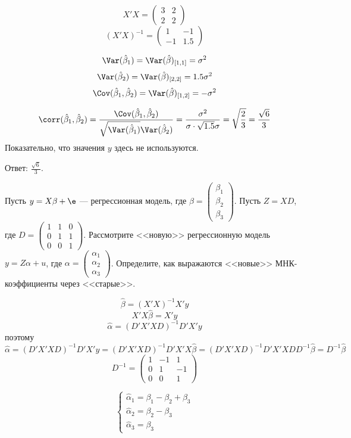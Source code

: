\documentclass[pdftex,11pt,openany]{book}\usepackage[]{graphicx}\usepackage[]{color}
\begin{document}
\begin{solution}
\[X'X=\left(\begin{array}{cc}
3 & 2 \\ 
2 & 2
\end{array}\right) \]
\[(X'X)^{-1}=\left(\begin{array}{cc}
1 & -1 \\ 
-1 & 1.5
\end{array}\right) \]

\[\Var(\hat\beta_1)=\Var(\hat\beta)_{[1,1]}=\sigma^2\]
\[\Var(\hat\beta_2)=\Var(\hat\beta)_{[2,2]}=1.5\sigma^2\]
\[\Cov(\hat\beta_1,\hat\beta_2)=\Var(\hat\beta)_{[1,2]}=-\sigma^2\]

\[\corr(\hat\beta_1,\hat\beta_2)=\frac{\Cov(\hat\beta_1,\hat\beta_2)}{\sqrt{\Var(\hat\beta_1)}\Var(\hat\beta_2)}=\\
\\\frac{\sigma^2}{\sigma\cdot\sqrt{1.5}\sigma}=\sqrt{\frac{2}{3}}=\frac{\sqrt6}{3}\]
Показательно, что значения $y$ здесь не используются.

Ответ: $\frac{\sqrt6}{3}$.
\end{solution}


\begin{problem} 
Пусть $y = X\beta + \e$ --- регрессионная модель, где $\beta = \begin{pmatrix} \beta_1 \\ \beta_2 \\ \beta_3 \end{pmatrix}$. Пусть $Z = XD$, где $D = \begin{pmatrix} 1 & 1 & 0 \\ 0 & 1 & 1 \\ 0 & 0 & 1 \end{pmatrix}$. Рассмотрите <<новую>> регрессионную модель $y = Z\alpha + u$, где $\alpha = \begin{pmatrix} \alpha_1 \\ \alpha_2 \\ \alpha_3 \end{pmatrix}$. Определите, как выражаются <<новые>> МНК-коэффициенты через <<старые>>.

\end{problem}

\begin{solution}
\[\hat\beta=(X'X)^{-1}X'y\]
\[X'X\hat\beta=X'y\]
\[\hat\alpha=(D'X'XD)^{-1}D'X'y\]
поэтому
\[\hat\alpha=(D'X'XD)^{-1}D'X'y=(D'X'XD)^{-1}D'X'X\hat\beta=(D'X'XD)^{-1}D'X'XDD^{-1}\hat\beta=D^{-1}\hat\beta\]
\[D^{-1}=\left(\begin{array}{ccc}
1 & -1 & 1\\ 
0 & 1 & -1\\
0 & 0 & 1
\end{array}\right)\]

\[\begin{cases}
\hat\alpha_1=\beta_1-\beta_2+\beta_3\\
\hat\alpha_2=\beta_2-\beta_3\\
\hat\alpha_3=\beta_3
\end{cases}\]
\end{solution}
\end{document}
